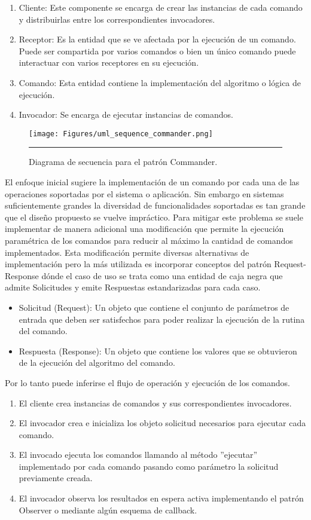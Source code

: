 \begin{enumerate}
	\item Cliente: Este componente se encarga de crear las instancias de cada comando y distribuirlas entre los correspondientes invocadores.
	\item Receptor: Es la entidad que se ve afectada por la ejecución de un comando. Puede ser compartida por varios comandos o bien un único comando puede interactuar con varios receptores en su ejecución.
	\item Comando: Esta entidad contiene la implementación del algoritmo o lógica de ejecución.
	\item Invocador: Se encarga de ejecutar instancias de comandos.
\end{enumerate}

\begin{figure}[htbp]
	\centering
	\texttt{[image: Figures/uml\_sequence\_commander.png]}
	\rule{35em}{1pt}
	\caption[MVP Components]{Diagrama de secuencia para el patrón Commander.}
	\label{fig:uml_commander_sequence}
\end{figure}

El enfoque inicial sugiere la implementación de un comando
por cada una de las operaciones soportadas por el sistema o aplicación. Sin embargo en sistemas suficientemente grandes la diversidad de funcionalidades soportadas es tan grande que el diseño propuesto se vuelve impráctico.
Para mitigar este problema se suele implementar de manera adicional una modificación que permite la ejecución paramétrica de los comandos para reducir al máximo la cantidad de comandos implementados.
Esta modificación permite diversas alternativas de implementación pero la más utilizada es incorporar conceptos del patrón Request-Response dónde el caso de uso se trata como una entidad de caja negra que admite Solicitudes y emite Respuestas estandarizadas para cada caso.
\begin{itemize}
	\item Solicitud (Request): Un objeto que contiene el conjunto de parámetros de entrada que deben ser satisfechos para poder realizar la ejecución de la rutina del comando.
	\item Respuesta (Response): Un objeto que contiene los valores que se obtuvieron de la ejecución del algoritmo del comando.
\end{itemize}

Por lo tanto puede inferirse el flujo de operación y ejecución de los comandos.

\begin{enumerate}
	\item El cliente crea instancias de comandos y sus correspondientes invocadores. 
	\item El invocador crea e inicializa los objeto solicitud necesarios para ejecutar cada comando.
	\item El invocado ejecuta los comandos llamando al método ''ejecutar'' implementado por cada comando pasando como parámetro la solicitud previamente creada.
	\item El invocador observa los resultados en espera activa implementando el patrón Observer o mediante algún esquema de callback.
\end{enumerate}

